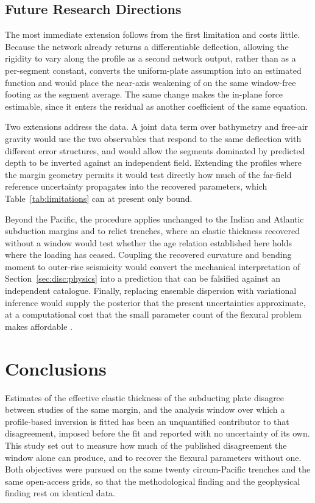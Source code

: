 \documentclass[final]{agujournal2019}
\begin{document}
\subsection{Future Research Directions}\label{sec:disc:future}

The most immediate extension follows from the first limitation and costs little.
Because the network already returns a differentiable deflection, allowing the
rigidity to vary along the profile as a second network output, rather than as a
per-segment constant, converts the uniform-plate assumption into an estimated
function and would place the near-axis weakening of  on
the same window-free footing as the segment average. The same change makes the
in-plane force estimable, since it enters the residual as another coefficient of
the same equation.

Two extensions address the data. A joint data term over bathymetry and free-air
gravity would use the two observables that respond to the same deflection with
different error structures, and would allow the segments dominated by predicted
depth to be inverted against an independent field. Extending the profiles where
the margin geometry permits it would test directly how much of the far-field
reference uncertainty propagates into the recovered parameters, which
Table~\ref{tab:limitations} can at present only bound.

Beyond the Pacific, the procedure applies unchanged to the Indian and Atlantic
subduction margins and to relict trenches, where an elastic thickness recovered
without a window would test whether the age relation established here holds
where the loading has ceased. Coupling the recovered curvature and bending
moment to outer-rise seismicity would convert the mechanical interpretation of
Section~\ref{sec:disc:physics} into a prediction that can be falsified against
an independent catalogue. Finally, replacing ensemble dispersion with
variational inference would supply the posterior that the present uncertainties
approximate, at a computational cost that the small parameter count of the
flexural problem makes affordable
\cite{Li2024Bayesian,Psaros2023,Fasel2022,SashidharKutz2022}.

\section{Conclusions}\label{sec:conclusions}

Estimates of the effective elastic thickness of the subducting plate disagree
between studies of the same margin, and the analysis window over which a
profile-based inversion is fitted has been an unquantified contributor to that
disagreement, imposed before the fit and reported with no uncertainty of its
own. This study set out to measure how much of the published disagreement the
window alone can produce, and to recover the flexural parameters without one.
Both objectives were pursued on the same twenty circum-Pacific trenches and the
same open-access grids, so that the methodological finding and the geophysical
finding rest on identical data.
\end{document}
